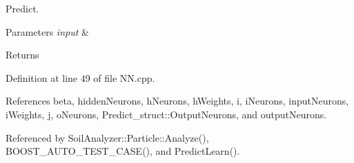 Predict. 


\begin{DoxyParams}{Parameters}
{\em input} & \\
\hline
\end{DoxyParams}
\begin{DoxyReturn}{Returns}

\end{DoxyReturn}


Definition at line 49 of file N\+N.\+cpp.



References beta, hidden\+Neurons, h\+Neurons, h\+Weights, i, i\+Neurons, input\+Neurons, i\+Weights, j, o\+Neurons, Predict\+\_\+struct\+::\+Output\+Neurons, and output\+Neurons.



Referenced by Soil\+Analyzer\+::\+Particle\+::\+Analyze(), B\+O\+O\+S\+T\+\_\+\+A\+U\+T\+O\+\_\+\+T\+E\+S\+T\+\_\+\+C\+A\+S\+E(), and Predict\+Learn().


